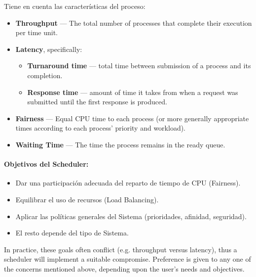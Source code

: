 \documentclass[a4paper, twoside]{article}
\begin{document}
Tiene en cuenta las características del proceso:

\begin{itemize}
  \item \textbf{Throughput} --- The total number of processes that complete
  their execution per time unit.
  \item \textbf{Latency}, specifically:
  \begin{itemize}
    \item \textbf{Turnaround time} --- total time between submission of
    a process and its completion.
    \item \textbf{Response time} --- amount of time it takes from when a request
    was submitted until the first response is produced.
  \end{itemize}
  \item \textbf{Fairness} --- Equal CPU time to each process (or more generally
  appropriate times according to each process' priority and workload).
  \item \textbf{Waiting Time} --- The time the process remains in the ready
  queue.
\end{itemize}

\paragraph{Objetivos del Scheduler:}

\begin{itemize}
  \item Dar una participación adecuada del reparto de tiempo de CPU (Fairness).
  \item Equilibrar el uso de recursos (Load Balancing).
  \item Aplicar las políticas generales del Sistema (prioridades, afinidad,
  seguridad).
  \item El resto depende del tipo de Sistema.
\end{itemize}

In practice, these goals often conflict (e.g. throughput versus latency),
thus a scheduler will implement a suitable compromise.
Preference is given to any one of the concerns mentioned above, depending upon
the user's needs and objectives.
\end{document}
